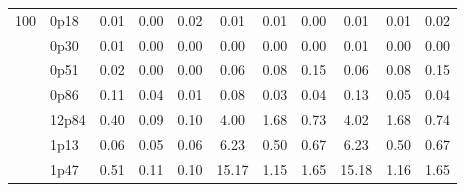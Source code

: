 \documentclass[12pt,A4paper]{article}
\begin{document}
\begin{table}[]
\begin{tabular}{lllllllllll}
\multicolumn{1}{|l|}{\multirow{13}{*}{100}} & \multicolumn{1}{l|}{0p18} & \multicolumn{1}{c|}{0.01}        & \multicolumn{1}{c|}{0.00}         & \multicolumn{1}{c|}{0.02}        & \multicolumn{1}{c|}{0.01}         & \multicolumn{1}{c|}{0.01}        & \multicolumn{1}{c|}{0.00}         & \multicolumn{1}{c|}{0.01}         & \multicolumn{1}{c|}{0.01}         & \multicolumn{1}{c|}{0.02}         \\ \cline{2-11} 
\multicolumn{1}{|l|}{} & \multicolumn{1}{l|}{0p30} & \multicolumn{1}{c|}{0.01}        & \multicolumn{1}{c|}{0.00}         & \multicolumn{1}{c|}{0.00}        & \multicolumn{1}{c|}{0.00}         & \multicolumn{1}{c|}{0.00}        & \multicolumn{1}{c|}{0.00}        & \multicolumn{1}{c|}{0.01}        & \multicolumn{1}{c|}{0.00}        & \multicolumn{1}{c|}{0.00}         \\ \cline{2-11}
\multicolumn{1}{|l|}{} & \multicolumn{1}{l|}{0p51} & \multicolumn{1}{c|}{0.02}        & \multicolumn{1}{c|}{0.00}         & \multicolumn{1}{c|}{0.00}        & \multicolumn{1}{c|}{0.06}         & \multicolumn{1}{c|}{0.08}        & \multicolumn{1}{c|}{0.15}        & \multicolumn{1}{c|}{0.06}        & \multicolumn{1}{c|}{0.08}        & \multicolumn{1}{c|}{0.15}         \\ \cline{2-11}
\multicolumn{1}{|l|}{} & \multicolumn{1}{l|}{0p86} & \multicolumn{1}{c|}{0.11}        & \multicolumn{1}{c|}{0.04}         & \multicolumn{1}{c|}{0.01}        & \multicolumn{1}{c|}{0.08}         & \multicolumn{1}{c|}{0.03}        & \multicolumn{1}{c|}{0.04}        & \multicolumn{1}{c|}{0.13}        & \multicolumn{1}{c|}{0.05}        & \multicolumn{1}{c|}{0.04}         \\ \cline{2-11}
\multicolumn{1}{|l|}{} & \multicolumn{1}{l|}{12p84} & \multicolumn{1}{c|}{0.40}        & \multicolumn{1}{c|}{0.09}         & \multicolumn{1}{c|}{0.10}        & \multicolumn{1}{c|}{4.00}         & \multicolumn{1}{c|}{1.68}        & \multicolumn{1}{c|}{0.73}        & \multicolumn{1}{c|}{4.02}        & \multicolumn{1}{c|}{1.68}        & \multicolumn{1}{c|}{0.74}         \\ \cline{2-11}
\multicolumn{1}{|l|}{} & \multicolumn{1}{l|}{1p13} & \multicolumn{1}{c|}{0.06}        & \multicolumn{1}{c|}{0.05}         & \multicolumn{1}{c|}{0.06}        & \multicolumn{1}{c|}{6.23}         & \multicolumn{1}{c|}{0.50}        & \multicolumn{1}{c|}{0.67}        & \multicolumn{1}{c|}{6.23}        & \multicolumn{1}{c|}{0.50}        & \multicolumn{1}{c|}{0.67}         \\ \cline{2-11}
\multicolumn{1}{|l|}{} & \multicolumn{1}{l|}{1p47} & \multicolumn{1}{c|}{0.51}        & \multicolumn{1}{c|}{0.11}         & \multicolumn{1}{c|}{0.10}        & \multicolumn{1}{c|}{15.17}         & \multicolumn{1}{c|}{1.15}        & \multicolumn{1}{c|}{1.65}        & \multicolumn{1}{c|}{15.18}        & \multicolumn{1}{c|}{1.16}        & \multicolumn{1}{c|}{1.65}         \\ \cline{2-11}

\end{tabular}
\end{table}
\end{document}
